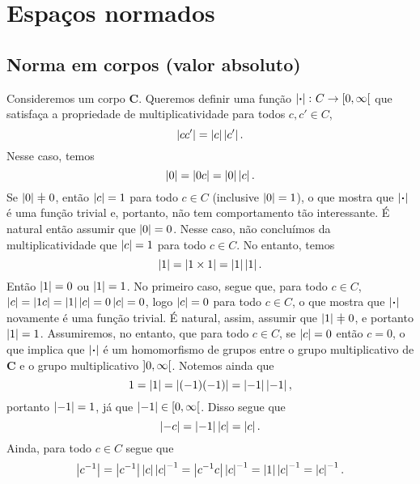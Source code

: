\chapter{Espaços normados}

\section{Norma em corpos (valor absoluto)}

Consideremos um corpo $\bm C$. Queremos definir uma função $\left\vert{\bm{\cdot}}\right\vert\colon C \to \left[{0},{\infty}\right[$ que satisfaça a propriedade de multiplicatividade para todos $c,c' \in C$,
	\begin{equation*}
	\left\vert{cc'}\right\vert = \left\vert{c}\right\vert\left\vert{c'}\right\vert.
	\end{equation*}
Nesse caso, temos
	\begin{equation*}
	\left\vert{0}\right\vert=\left\vert{0c}\right\vert = \left\vert{0}\right\vert\left\vert{c}\right\vert.
	\end{equation*}
Se $\abs{0} \neq 0$, então $\left\vert{c}\right\vert=1$ para todo $c \in C$ (inclusive $\left\vert{0}\right\vert=1$), o que mostra que $\left\vert{\bm{\cdot}}\right\vert$ é uma função trivial e, portanto, não tem comportamento tão interessante. É natural então assumir que $\left\vert{0}\right\vert=0$. Nesse caso, não concluímos da multiplicatividade que $\left\vert{c}\right\vert=1$ para todo $c \in C$. No entanto, temos
	\begin{equation*}
	\left\vert{1}\right\vert = \left\vert{1 \times 1}\right\vert = \left\vert{1}\right\vert\left\vert{1}\right\vert.
	\end{equation*}
Então $\left\vert{1}\right\vert=0$ ou $\left\vert{1}\right\vert=1$. No primeiro caso, segue que, para todo $c \in C$, $\left\vert{c}\right\vert = \left\vert{1c}\right\vert = \left\vert{1}\right\vert\left\vert{c}\right\vert = 0 \left\vert{c}\right\vert = 0$, logo $\left\vert{c}\right\vert = 0$ para todo $c \in C$, o que mostra que $\left\vert{\bm{\cdot}}\right\vert$ novamente é uma função trivial. É natural, assim, assumir que $\abs{1} \neq 0$, e portanto $\left\vert{1}\right\vert=1$. Assumiremos, no entanto, que para todo $c \in C$, se $\left\vert{c}\right\vert = 0$ então $c=0$, o que implica que $\left\vert{\bm{\cdot}}\right\vert$ é um homomorfismo de grupos entre o grupo multiplicativo de $\bm C$ e o grupo multiplicativo $\left]{0},{\infty}\right[$.
Notemos ainda que
	\begin{equation*}
	1 = \left\vert{1}\right\vert = \left\vert{(-1)(-1)}\right\vert = \left\vert{-1}\right\vert\left\vert{-1}\right\vert,
	\end{equation*}
portanto $\left\vert{-1}\right\vert = 1$, já que $\left\vert{-1}\right\vert \in \left[{0},{\infty}\right[$. Disso segue que
	\begin{equation*}
	\left\vert{-c}\right\vert = \left\vert{-1}\right\vert\left\vert{c}\right\vert=\left\vert{c}\right\vert.
	\end{equation*}
Ainda, para todo $c \in C$ segue que
	\begin{equation*}
	\left\vert{c^{-1}}\right\vert = \left\vert{c^{-1}}\right\vert\left\vert{c}\right\vert\left\vert{c}\right\vert^{-1} = \left\vert{c^{-1}c}\right\vert\left\vert{c}\right\vert^{-1} = \left\vert{1}\right\vert\left\vert{c}\right\vert^{-1} = \left\vert{c}\right\vert^{-1}.
	\end{equation*}


